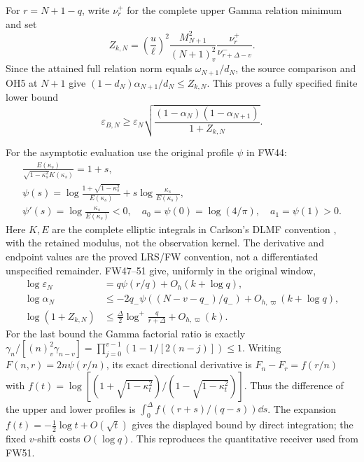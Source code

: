 \documentclass[11pt]{article}
\newcommand{\eps}{\varepsilon}
\begin{document}
For $r=N+1-q$, write $\nu^+_r$ for the complete upper Gamma relation
minimum and set
\begin{equation}\tag{OH6}
 Z_{k,N}=\left(\frac u\ell\right)^2
 \frac{M_{N+1}^2}{(N+1)_v^2}
 \frac{\nu^+_r}{\nu^-_{r+\Delta-v}}.
\end{equation}
Since the attained full relation norm equals $\omega_{N+1}/d_N$,
the source comparison and OH5 at $N+1$ give
$ (1-d_N)\alpha_{N+1}/d_N\le Z_{k,N}$.
This proves a fully specified finite lower bound
\begin{equation}\tag{OH7}
 \eps_{B,N}\ge\eps_N
 \sqrt{\frac{(1-\alpha_N)(1-\alpha_{N+1})}{1+Z_{k,N}}}.
\end{equation}

For the asymptotic evaluation use the original profile $\psi$ in FW44:
\begin{equation}\tag{OH8}\begin{gathered}
 \frac{E(\kappa_s)}{\sqrt{1-\kappa_s^2}K(\kappa_s)}=1+s,\\
 \psi(s)=\log\frac{1+\sqrt{1-\kappa_s^2}}{E(\kappa_s)}
            +s\log\frac{\kappa_s}{E(\kappa_s)},\\
 \psi'(s)=\log\frac{\kappa_s}{E(\kappa_s)}<0,\quad
 a_0=\psi(0)=\log(4/\pi),\quad a_1=\psi(1)>0.
\end{gathered}\end{equation}
Here $K,E$ are the complete elliptic integrals in Carlson's DLMF
convention \cite{Carlson}, with the retained modulus,
not the observation kernel. The derivative and endpoint values are the
proved LRS/FW convention, not a differentiated unspecified remainder.
FW47--51 give, uniformly in the original window,
\begin{equation}\tag{OH9}\begin{aligned}
 \log\eps_N&=q\psi(r/q)+O_h(k+\log q),\\
 \log\alpha_N&\le-2q_-\psi((N-v-q_-)/q_-)+O_{h,\varpi}(k+\log q),\\
 \log(1+Z_{k,N})&\le\frac\Delta2\log^+\frac q{r+\Delta}
                         +O_{h,\varpi}(k).
\end{aligned}\end{equation}
For the last bound the Gamma factorial ratio is exactly
$\gamma_n/[(n)_v^2\gamma_{n-v}]=\prod_{j=0}^{v-1}(1-1/[2(n-j)])\le1$.
Writing $F(n,r)=2n\psi(r/n)$, its exact directional derivative is
$F_n-F_r=f(r/n)$ with $f(t)=\log[(1+\sqrt{1-\kappa_t^2})/
(1-\sqrt{1-\kappa_t^2})]$. Thus the difference of the upper and lower
profiles is $\int_0^\Delta f((r+s)/(q-s))\dd s$. The expansion
$f(t)=-\tfrac12\log t+O(\sqrt t)$ gives the displayed bound by direct
integration; the fixed $v$-shift costs $O(\log q)$. This reproduces
the quantitative receiver used from FW51.
\end{document}
